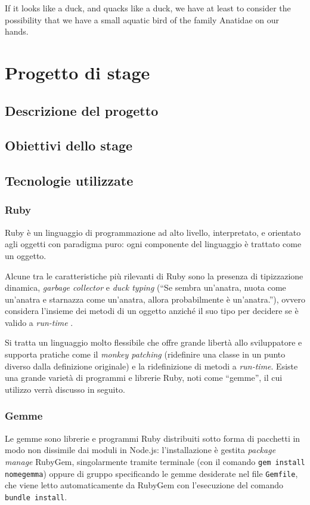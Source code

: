 
\begin{savequote}[75mm]
    If it looks like a duck, and quacks like a duck, we have at least to consider the possibility that we have a small aquatic bird of the family Anatidae on our hands.
\end{savequote}
\chapter{Progetto di stage}

\section{Descrizione del progetto}

\section{Obiettivi dello stage}

\section{Tecnologie utilizzate}

\subsection{Ruby}
Ruby è un linguaggio di programmazione ad alto livello, interpretato, e orientato agli oggetti con paradigma puro: ogni componente del linguaggio è trattato come un oggetto. 

Alcune tra le caratteristiche più rilevanti di Ruby sono la presenza di tipizzazione dinamica, \textit{garbage collector} e \textit{duck typing} (``Se sembra un'anatra, nuota come un'anatra e starnazza come un'anatra, allora probabilmente è un'anatra.''), ovvero considera l'insieme dei metodi di un oggetto anziché il suo tipo per decidere se è valido a \textit{run-time} .

Si tratta un linguaggio molto flessibile che offre grande libertà allo sviluppatore e supporta pratiche come il \textit{monkey patching} (ridefinire una classe in un punto diverso dalla definizione originale) e la ridefinizione di metodi a \textit{run-time}.
Esiste una grande varietà di programmi e librerie Ruby, noti come ``gemme'', il cui utilizzo verrà discusso in seguito.
\subsection{Gemme}
Le gemme sono librerie e programmi Ruby distribuiti sotto forma di pacchetti in modo non dissimile dai moduli in Node.js: l'installazione è gestita \textit{package manage} RubyGem, singolarmente tramite terminale (con il comando \texttt{gem install nomegemma}) oppure di gruppo specificando le gemme desiderate nel file \texttt{Gemfile}, che viene letto automaticamente da RubyGem con l'esecuzione del comando \texttt{bundle install}.

